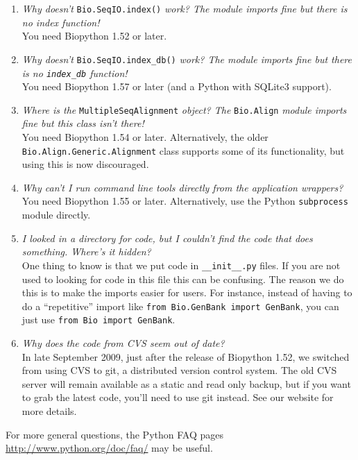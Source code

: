 \documentclass{report}
\begin{document}
\begin{enumerate}
  \item \emph{Why doesn't} \verb|Bio.SeqIO.index()| \emph{work? The module imports fine but there is no index function!} \\
  You need Biopython 1.52 or later.
  
  \item \emph{Why doesn't} \verb|Bio.SeqIO.index_db()| \emph{work? The module imports fine but there is no \texttt{index\_db} function!} \\
  You need Biopython 1.57 or later (and a Python with SQLite3 support).
  
  \item \emph{Where is the} \verb|MultipleSeqAlignment| \emph{object? The} \verb|Bio.Align| \emph{module imports fine but this class isn't there!} \\
  You need Biopython 1.54 or later. Alternatively, the older \verb|Bio.Align.Generic.Alignment| class supports some of its functionality, but using this is now discouraged.

  \item \emph{Why can't I run command line tools directly from the application wrappers?} \\
  You need Biopython 1.55 or later. Alternatively, use the Python \verb|subprocess| module directly.
  
  \item \emph{I looked in a directory for code, but I couldn't find the code that does something. Where's it hidden?} \\
  One thing to know is that we put code in \verb|__init__.py| files. If you are not used to looking for code in this file this can be confusing. The reason we do this is to make the imports easier for users. For instance, instead of having to do a ``repetitive'' import like \verb|from Bio.GenBank import GenBank|, you can just use \verb|from Bio import GenBank|.

 \item \emph{Why does the code from CVS seem out of date?} \\
  In late September 2009, just after the release of Biopython 1.52, we switched from using CVS to git, a distributed version control system. The old CVS server will remain available as a static and read only backup, but if you want to grab the latest code, you'll need to use git instead. See our website for more details.
\end{enumerate}

\noindent For more general questions, the Python FAQ pages \url{http://www.python.org/doc/faq/} may be useful.
\end{document}
